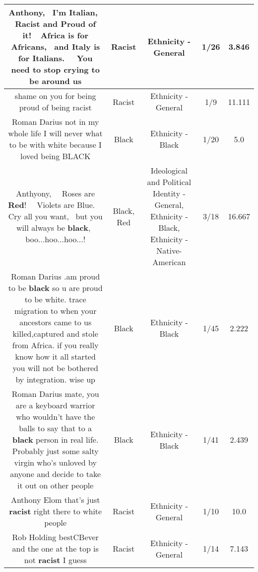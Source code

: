 \documentclass[11pt]{article}
\newlength\mylength
\begin{document}
\begin{center}
\begin{longtable}{|C{.65\mylength}|C{.30\mylength}|C{.12\mylength}|C{.12\mylength}|C{.12\mylength}|}
  \small Anthony,  I'm Italian,  \textbf{Racist} and Proud of it!  Africa is for Africans,  and Italy is for Italians.   You need to stop crying to be around us\normalsize   & Racist & Ethnicity - General & 1/26 & 3.846 \\  \hline
  \small shame on you for being proud of being racist\normalsize   & Racist & Ethnicity - General & 1/9 & 11.111 \\  \hline
  \small Roman Darius not in my whole life I will never what to be with white because I loved being BLACK\normalsize   & Black & Ethnicity - Black & 1/20 & 5.0 \\  \hline
  \small Anthyony,   Roses are \textbf{R\textbf{ed}}!   Violets are Blue.   Cry all you want,  but you will always be \textbf{black},  boo...hoo...hoo...!\normalsize   & Black, Red &  Ideological and Political Identity - General, Ethnicity - Black, Ethnicity - Native-American & 3/18 & 16.667 \\  \hline
  \small Roman Darius .am proud to be \textbf{black} so u are proud to be white. trace migration to when your ancestors came to us killed,captured and stole from Africa. if you really know how it all started you will not be bothered by integration. wise up\normalsize   & Black & Ethnicity - Black & 1/45 & 2.222 \\  \hline
  \small Roman Darius mate, you are a keyboard warrior who wouldn't have the balls to say that to a \textbf{black} person in real life. Probably just some salty virgin who's unloved by anyone and decide to take it out on other people\normalsize   & Black & Ethnicity - Black & 1/41 & 2.439 \\  \hline
  \small Anthony Elom that's just \textbf{racist} right there to white people\normalsize   & Racist & Ethnicity - General & 1/10 & 10.0 \\  \hline
  \small Rob Holding bestCBever and the one at the top is not \textbf{racist} I guess\normalsize   & Racist & Ethnicity - General & 1/14 & 7.143 \\  \hline

\end{longtable}
\end{center}
\end{document}
